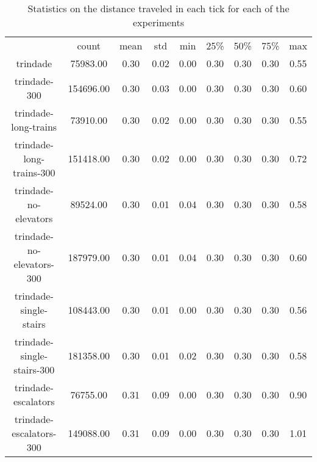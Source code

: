 \begin{table*}

    \begin{tabular}{|c|cccccccc|}
     & count & mean & std & min & 25\% & 50\% & 75\% & max \\
    trindade & 75983.00 & 0.30 & 0.02 & 0.00 & 0.30 & 0.30 & 0.30 & 0.55 \\
    trindade-300 & 154696.00 & 0.30 & 0.03 & 0.00 & 0.30 & 0.30 & 0.30 & 0.60 \\
    trindade-long-trains & 73910.00 & 0.30 & 0.02 & 0.00 & 0.30 & 0.30 & 0.30 & 0.55 \\
    trindade-long-trains-300 & 151418.00 & 0.30 & 0.02 & 0.00 & 0.30 & 0.30 & 0.30 & 0.72 \\
    trindade-no-elevators & 89524.00 & 0.30 & 0.01 & 0.04 & 0.30 & 0.30 & 0.30 & 0.58 \\
    trindade-no-elevators-300 & 187979.00 & 0.30 & 0.01 & 0.04 & 0.30 & 0.30 & 0.30 & 0.60 \\
    trindade-single-stairs & 108443.00 & 0.30 & 0.01 & 0.00 & 0.30 & 0.30 & 0.30 & 0.56 \\
    trindade-single-stairs-300 & 181358.00 & 0.30 & 0.01 & 0.02 & 0.30 & 0.30 & 0.30 & 0.58 \\
    trindade-escalators & 76755.00 & 0.31 & 0.09 & 0.00 & 0.30 & 0.30 & 0.30 & 0.90 \\
    trindade-escalators-300 & 149088.00 & 0.31 & 0.09 & 0.00 & 0.30 & 0.30 & 0.30 & 1.01 \\
    \end{tabular}
\caption{Statistics on the distance traveled in each tick for each of the experiments}
\label{annex:tick_distance}

\end{table*}

